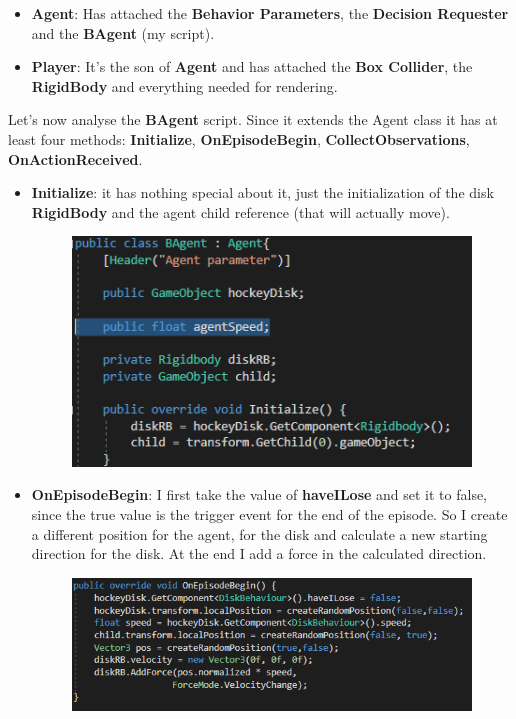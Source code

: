 \documentclass[12pt]{article}
\begin{document}
	\begin{itemize}
		\item \textbf{Agent}: Has attached the \textbf{Behavior Parameters}, the \textbf{Decision Requester} and the \textbf{BAgent} (my script).
		\item \textbf{Player}: It's the son of \textbf{Agent} and has attached the \textbf{Box Collider}, the \textbf{RigidBody} and everything needed for rendering.
	\end{itemize}
	
	\noindent
	Let's now analyse the \textbf{BAgent} script. Since it extends the Agent class it has at least four methods: \textbf{Initialize}, \textbf{OnEpisodeBegin},\textbf{ CollectObservations},\textbf{ OnActionReceived}.\\
	
	\begin{itemize}
		\item \textbf{Initialize}: it has nothing special about it, just the initialization of the disk \textbf{RigidBody} and the agent child reference (that will actually move).	
		
		\begin{figure}[hbt!]
			\centering
			\includegraphics[width= 0.8
			\textwidth]{images/Initialize.png}
		\end{figure} 
	
		\item \textbf{OnEpisodeBegin}: I first take the value of \textbf{haveILose} and set it to false, since the true value is the trigger event for the end of the episode. So I create a different position for the agent, for the disk and calculate a new starting direction for the disk. At the end I add a force in the calculated direction.
		
		\newpage
		
		\begin{figure}[hbt!]
			\centering
			\includegraphics[width= 1
			\textwidth]{images/OnEpisodeBegin.png}
		\end{figure} 
	

\end{itemize}
\end{document}
